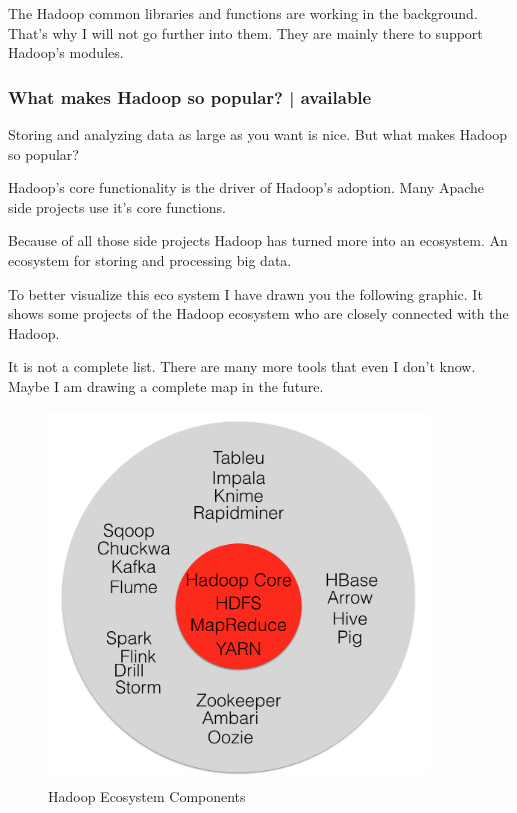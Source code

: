 \documentclass[12pt]{scrartcl} %
\begin{document}
The Hadoop common libraries and functions are working in the background. That’s why I will not go further into them. They are mainly there to support Hadoop’s modules.

\subsubsection{What makes Hadoop so popular? | available}
Storing and analyzing data as large as you want is nice. But what makes Hadoop so popular?

Hadoop’s core functionality is the driver of Hadoop’s adoption. Many Apache side projects use it’s core functions.

Because of all those side projects Hadoop has turned more into an ecosystem. An ecosystem for storing and processing big data.

To better visualize this eco system I have drawn you the following graphic. It shows some projects of the Hadoop ecosystem who are closely connected with the Hadoop.

It is not a complete list. There are many more tools that even I don’t know. Maybe I am drawing a complete map in the future.

\begin{figure}[htbp] 
  \centering
     \includegraphics[width=0.9\textwidth]{images/Hadoop-Ecosystem.png}
  \caption{Hadoop Ecosystem Components}
  \label{fig:Bild1}
\end{figure}
\end{document}
